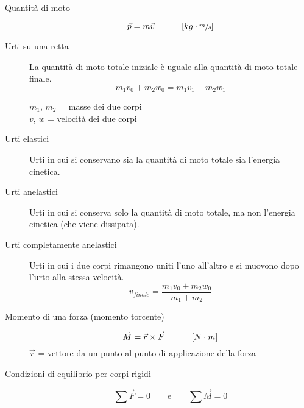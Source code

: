 \documentclass[a4paper,11pt,italian]{article}
\begin{document}
\begin{description}
  \item[Quantità di moto] 
  \[ \vec{p} = m \vec{v} \hspace*{3em} \left[ kg \cdot \sfrac{m}{s} \right] \] 
  
  
  \item[Urti su una retta] 
  La quantità di moto totale iniziale è uguale alla quantità di moto totale finale.
  \[ m_1 v_0 + m_2 w_0 = m_1 v_1 + m_2 w_1 \]
  \begin{multicols}{2}
  $ m_1 $, $ m_2 $ = masse dei due corpi\\
  $ v $, $ w $ = velocità dei due corpi
  \end{multicols}
  
  \item[Urti elastici] 
  Urti in cui si conservano sia la quantità di moto totale sia l'energia cinetica.
  
  \item[Urti anelastici] 
  Urti in cui si conserva solo la quantità di moto totale, ma non l'energia cinetica (che viene dissipata).
  
  \item[Urti completamente anelastici] 
  Urti in cui i due corpi rimangono uniti l'uno all'altro e si muovono dopo l'urto alla stessa velocità.
  \[ v_{finale} = \frac{m_1 v_0 + m_2 w_0}{m_1 + m_2} \]
  
  \item[Momento di una forza (momento torcente)]
  \[ \vec{M} = \vec{r} \times \vec{F} \hspace*{3em} \left[ N \cdot m \right] \]
  $ \vec{r} $ = vettore da un punto al punto di applicazione della forza
  
  \item[Condizioni di equilibrio per corpi rigidi]
  \[ \sum \vec{F} = 0 \quad\quad\textrm{e}\quad\quad \sum \vec{M} = 0 \]


\end{description}
\end{document}

